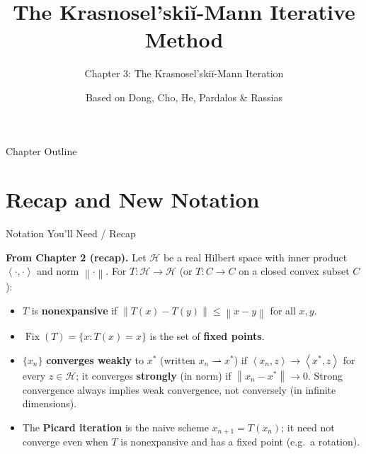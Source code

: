 \documentclass[aspectratio=169,10pt]{beamer}
\title[KM Method -- Ch.3]{The Krasnosel'ski\u{i}-Mann Iterative Method}
\subtitle{Chapter 3: The Krasnosel'ski\u{i}-Mann Iteration}
\author{Based on Dong, Cho, He, Pardalos \& Rassias}
\institute{SpringerBriefs in Optimization, 2022}
\date{}
\newcommand{\cH}{\mathcal{H}}
\newcommand{\Fix}{\operatorname{Fix}}
\newcommand{\norm}[1]{\left\|#1\right\|}
\newcommand{\inner}[2]{\left\langle #1, #2 \right\rangle}
\newcommand{\weakto}{\rightharpoonup}
\begin{document}

\begin{frame}
  \titlepage
\end{frame}

\begin{frame}{Chapter Outline}
  \tableofcontents
\end{frame}

\section{Recap and New Notation}

\begin{frame}[allowframebreaks]{Notation You'll Need / Recap}

  \textbf{From Chapter 2 (recap).} Let $\cH$ be a real Hilbert space
  with inner product $\inner{\cdot}{\cdot}$ and norm $\norm{\cdot}$.
  For $T:\cH\to\cH$ (or $T:C\to C$ on a closed convex subset $C$):
  \begin{itemize}
    \item $T$ is \textbf{nonexpansive} if $\norm{T(x)-T(y)}\le\norm{x-y}$
      for all $x,y$.
    \item $\Fix(T)=\{x : T(x)=x\}$ is the set of \textbf{fixed points}.
    \item $\{x_n\}$ \textbf{converges weakly} to $x^*$ (written
      $x_n \weakto x^*$) if $\inner{x_n}{z}\to \inner{x^*}{z}$ for every
      $z\in\cH$; it converges \textbf{strongly} (in norm) if
      $\norm{x_n-x^*}\to 0$. Strong convergence always implies weak
      convergence, not conversely (in infinite dimensions).
    \item The \textbf{Picard iteration} is the naive scheme
      $x_{n+1}=T(x_n)$; it need not converge even when $T$ is
      nonexpansive and has a fixed point (e.g.\ a rotation).
  \end{itemize}

  \framebreak


\end{frame}
\end{document}
